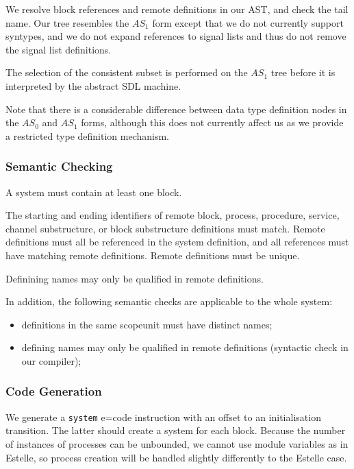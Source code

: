 We resolve block references and remote definitions in our AST,
and check the tail name. Our tree resembles the $AS_1$ form except
that we do not currently support syntypes, and we do not expand
references to signal lists and thus do not remove the signal list
definitions.

The selection of the consistent subset is performed on the $AS_1$
tree before it is interpreted by the abstract SDL machine.

Note that there is a considerable difference between data type
definition nodes in the $AS_0$ and $AS_1$ forms, although this
does not currently affect us as we provide a restricted type
definition mechanism.

\subsubsection{Semantic Checking}

A system must contain at least one block. 

The starting and ending
identifiers of remote block, process, procedure, service, channel
substructure, or block substructure definitions must match.
Remote definitions must all be referenced in the system
definition, and all references must have matching remote definitions.
Remote definitions must be unique.

Definining names may only be qualified in remote definitions.

In addition, the following semantic checks are applicable to the
whole system:

\begin{itemize}
\item definitions in the same scopeunit must have distinct names;
\item defining names may only be qualified in remote definitions
(syntactic check in our compiler);
\end{itemize}

\subsubsection{Code Generation}

We generate a {\tt system} e=code instruction with an offset to
an initialisation transition.
The latter should create a system for each block.
Because the number of instances of processes can be unbounded, we
cannot use module variables as in Estelle, so process creation will
be handled slightly differently to the Estelle case.

